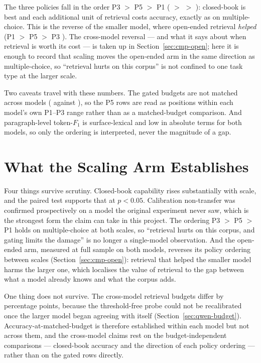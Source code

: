 The three policies fall in the order P3 $>$ P5 $>$ P1
(\fOneQwenPthreeOpen{} $>$ \fOneQwenPfiveOpen{} $>$ \fOneQwenPoneOpen{}):
closed-book is best and each additional unit of retrieval costs accuracy,
exactly as on multiple-choice. This is the reverse of the smaller model, where
open-ended retrieval \emph{helped} (P1 \fOnePoneOpen{} $>$ P5 \fOnePfiveOpen{}
$>$ P3 \fOnePthreeOpen{}). The cross-model reversal --- and what it says about
when retrieval is worth its cost --- is taken up in
Section~\ref{sec:cmp-open}; here it is enough to record that scaling moves the
open-ended arm in the same direction as multiple-choice, so ``retrieval hurts on
this corpus'' is not confined to one task type at the larger scale.

Two caveats travel with these numbers. The gated budgets are not matched across
models (\retQwenPfiveOpen{} against \retPfiveOpen{}), so the P5 rows are read as
positions within each model's own P1--P3 range rather than as a matched-budget
comparison. And paragraph-level token-$F_1$ is surface-lexical and low in
absolute terms for both models, so only the ordering is interpreted, never the
magnitude of a gap.

\section{What the Scaling Arm Establishes}
\label{sec:qwen-summary}

Four things survive scrutiny. Closed-book capability rises substantially
with scale, and the paired test supports that at $p < 0.05$. Calibration
non-transfer was confirmed prospectively on a model the original experiment
never saw, which is the strongest form the claim can take in this project.
The ordering P3 $>$ P5 $>$ P1 holds on multiple-choice at both scales, so
``retrieval hurts on this corpus, and gating limits the damage'' is no longer a
single-model observation. And the open-ended arm, measured at full sample on
both models, reverses its policy ordering between scales
(Section~\ref{sec:cmp-open}): retrieval that helped the smaller model
harms the larger one, which localises the value of retrieval to the gap between
what a model already knows and what the corpus adds.

One thing does not survive. The cross-model retrieval budgets differ by
\budgetGapMcq{} percentage points, because the threshold-free probe could not be
recalibrated once the larger model began agreeing with itself
(Section~\ref{sec:qwen-budget}). Accuracy-at-matched-budget is therefore
established within each model but not across them, and the cross-model claims
rest on the budget-independent comparisons --- closed-book accuracy and the
direction of each policy ordering --- rather than on the gated rows directly.
